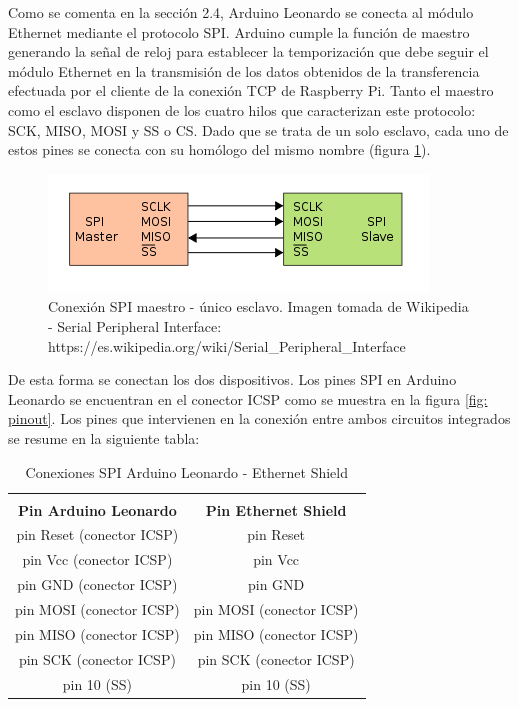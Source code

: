 Como se comenta en la sección 2.4, Arduino Leonardo se conecta al módulo Ethernet mediante el protocolo SPI. Arduino cumple la función de maestro generando la señal de reloj para establecer la temporización que debe seguir el módulo Ethernet en la transmisión de los datos obtenidos de la transferencia efectuada por el cliente de la conexión TCP de Raspberry Pi.
Tanto el maestro como el esclavo disponen de los cuatro hilos que caracterizan este protocolo: SCK, MISO, MOSI y SS o CS. Dado que se trata de un solo esclavo, cada uno de estos pines se conecta con su homólogo del mismo nombre (figura \ref{fig: SPImaestroesclavo}).
    \begin{figure}[H]
    \centering
    \includegraphics[scale = 0.6]{capitulo_04/figuras_dir/SPIconexion.jpg}
    \caption{Conexión SPI maestro - único esclavo. Imagen tomada de Wikipedia - Serial Peripheral Interface: https://es.wikipedia.org/wiki/Serial\_Peripheral\_Interface}
    \label{fig: SPImaestroesclavo}
    \end{figure}
De esta forma se conectan los dos dispositivos. Los pines SPI en Arduino Leonardo se encuentran en el conector ICSP como se muestra en la figura \ref{fig: pinout}.
Los pines que intervienen en la conexión entre ambos circuitos integrados se resume en la siguiente tabla:

\begin{table}[H]
\caption{Conexiones SPI Arduino Leonardo - Ethernet Shield}
\begin{center}
\begin{tabular}{cc}
     & \\
     {\bfseries Pin Arduino Leonardo} & {\bfseries Pin Ethernet Shield} \\ \hline
     pin Reset (conector ICSP) & pin Reset \\
     pin Vcc (conector ICSP) & pin Vcc \\
     pin GND (conector ICSP) & pin GND \\
     pin MOSI (conector ICSP) & pin MOSI (conector ICSP) \\
     pin MISO (conector ICSP) & pin MISO (conector ICSP) \\
     pin SCK (conector ICSP) & pin SCK (conector ICSP) \\
     pin 10 (SS) & pin 10 (SS) \\
\end{tabular}
\end{center}
\end{table}

